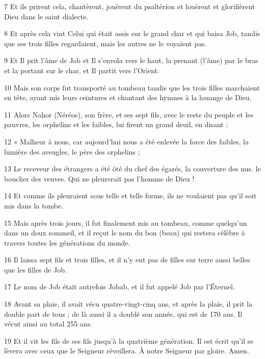 \par 7 Et ils prirent cela, chantèrent, jouèrent du psaltérion et louèrent et glorifièrent Dieu dans le saint dialecte.

\par 8 Et après cela vint Celui qui était assis sur le grand char et qui baisa Job, tandis que ses trois filles regardaient, mais les autres ne le voyaient pas.

\par 9 Et Il prit l'âme de Job et Il s'envola vers le haut, la prenant (l'âme) par le bras et la portant sur le char, et Il partit vers l'Orient.

\par 10 Mais son corps fut transporté au tombeau tandis que les trois filles marchaient en tête, ayant mis leurs ceintures et chantant des hymnes à la louange de Dieu.

\par 11 Alors Nahor (Néréos), son frère, et ses sept fils, avec le reste du peuple et les pauvres, les orphelins et les faibles, lui firent un grand deuil, en disant :

\par 12 « Malheur à nous, car aujourd'hui nous a été enlevée la force des faibles, la lumière des aveugles, le père des orphelins ;

\par 13 Le receveur des étrangers a été ôté du chef des égarés, la couverture des nus. le bouclier des veuves. Qui ne pleurerait pas l’homme de Dieu !

\par 14 Et comme ils pleuraient sous telle et telle forme, ils ne voulaient pas qu'il soit mis dans la tombe.

\par 15 Mais après trois jours, il fut finalement mis au tombeau, comme quelqu'un dans un doux sommeil, et il reçut le nom du bon (beau) qui restera célèbre à travers toutes les générations du monde.

\par 16 Il laissa sept fils et trois filles, et il n'y eut pas de filles sur terre aussi belles que les filles de Job.

\par 17 Le nom de Job était autrefois Jobab, et il fut appelé Job par l'Éternel.

\par 18 Avant sa plaie, il avait vécu quatre-vingt-cinq ans, et après la plaie, il prit la double part de tous ; de là aussi il a doublé son année, qui est de 170 ans. Il vécut ainsi au total 255 ans.

\par 19 Et il vit les fils de ses fils jusqu'à la quatrième génération. Il est écrit qu'il se lèvera avec ceux que le Seigneur réveillera. À notre Seigneur par gloire. Amen.

